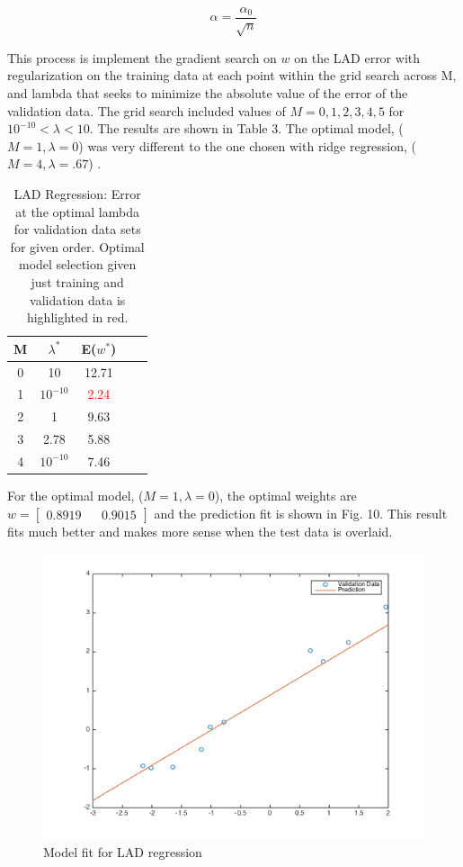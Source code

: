 \documentclass[10pt,twocolumn]{article}
\begin{document}
\begin{equation}
\alpha= \frac{\alpha_0 }{\sqrt{n}}
\end{equation}

This process is implement the gradient search on $w$ on the LAD error with regularization on the training data at each point within the grid search across M, and lambda that seeks to minimize the absolute value of the error of the validation data. The grid search included values of $M= {0,1,2,3,4,5}$  for $10^{-10} < \lambda <10 $. The results are shown in  Table 3. The optimal model, ($M=1, \lambda = 0$) was very different to the one chosen with ridge regression, ($M=4, \lambda=.67$) .
\begin{table}
\begin{center}
  \begin{tabular}{ | c | c | c | c | c | }
    \hline
     M & $\lambda ^*$  & E($w^*$) \\ \hline
     0 & 10 & 12.71  \\ \hline
     1 & $ 10^{-10}$ & \textcolor{red}{2.24}   \\ \hline
     2 & 1 & 9.63   \\ \hline
     3 & 2.78 & 5.88   \\ \hline
     4 & $10^{-10}$ & 7.46   \\ \hline
    
    \hline
  \end{tabular}
  \caption{LAD Regression: Error at the optimal lambda for validation data sets for given order. Optimal model selection given just training and validation data is highlighted in red. }
\end{center}
\label{table:ave_sse}
\end{table}

For the optimal model, ($M=1, \lambda = 0$), the optimal weights are $w= \begin{bmatrix} 0.8919  &&   0.9015 \end{bmatrix}$ and the prediction fit is shown in Fig. 10. This result fits much better and makes more sense when the test data is overlaid. 

\begin{figure}[H]
\center
\includegraphics[scale =.4]{4_1.png}
\caption{Model fit for LAD regression}
\end{figure}
\end{document}
